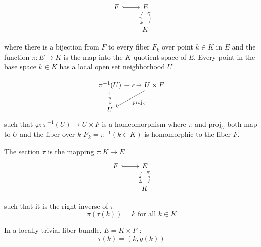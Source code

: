 \documentclass[../main.tex]{subfiles}
\begin{document}
\begin{equation}
    \begin{tikzcd}
        F \arrow[r, hook] & E \arrow[d, "\pi" description, bend right ] \\
                        & K \arrow[u, description, bend right]
    \end{tikzcd}
\end{equation}

where there is a bijection from $F$ to every fiber $F_k$ over point $k \in K$ in $E$ and the function $\pi: E \rightarrow K$ is the map into the $K$ quotient space of $E$. Every point in the base space $k \in K$ has a local open set neighborhood $U$ \cite{FiberBundle2020, rowlandFiberBundle}

\begin{equation}
    \begin{tikzcd}
        \pi^{-1}(U) \arrow[r, "\varphi" description] \arrow[d, "\pi" description] & U \times F \arrow[ld, "\mathrm{proj}_U"] \\
        U                                                                         &                                         
    \end{tikzcd}
    \label{eq:local_trivial}
\end{equation}
such that $\varphi: \pi^{-1}(U) \rightarrow U \times F$ is a homeomorphism where $\pi$ and $\mathrm{proj}_U$ both map to $U$ and the fiber over $k$ $F_k = \pi^{-1}({k \in K}) $ is homomorphic to the fiber $F$.

The section $\tau$ is the mapping $\tau: K\rightarrow E$ 
\begin{equation}
    \begin{tikzcd}
        F \arrow[r, hook] & E \arrow[d, "\pi" description, bend right]    \\
                          & K \arrow[u, "\tau" description, bend right]
        \end{tikzcd}
\end{equation}

such that it is the right inverse of $\pi$
\begin{equation}
    \pi(\tau(k)) = k \text{ for all } k \in K 
\end{equation}

In a locally trivial fiber bundle, $E = K \times F$ \cite{rowlandFiberBundle,FiberBundle2020}:
\begin{equation}
\tau(k) = (k, g(k))
\end{equation}
\end{document}
